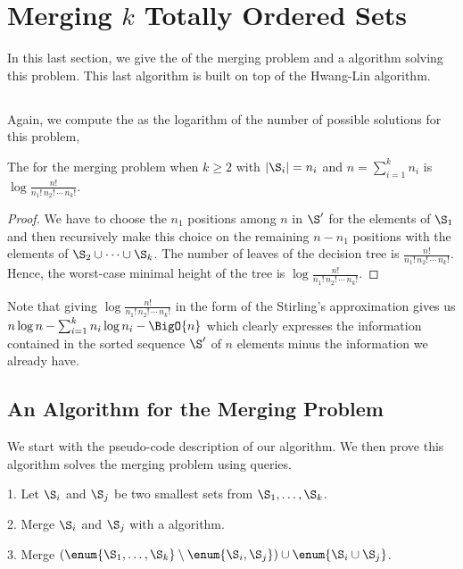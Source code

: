 \section{Merging $k$ Totally Ordered Sets}
\label{tree:merging:kgeq3}

In this last section, we give the \ITLB of the merging
problem and a \BigO{\ITLB} algorithm solving this problem. This last
algorithm is built on top of the Hwang-Lin algorithm.

\subsection{\ITLB}
\label{tree:merging:kgeq3:ITLB}

Again, we compute the \ITLB as the logarithm of the number of possible solutions
for this problem, \ie
\begin{theorem}
The \concept{\ITLB} for the merging problem when $k \ge 2$ with $|\S_i| = n_i$ and $n =
\sum_{i=1}^{k} n_i$ is \(\log \frac{n!}{n_1! \, n_2! \, \cdots \, n_k!}\).
\end{theorem}
\begin{proof}
We have to choose the $n_1$ positions among $n$ in $\S'$ for the elements of
$\S_1$ and then recursively make this choice on the remaining $n - n_1$
positions with the elements of \(\S_2 \cup \dots \cup \S_k\). The number of
leaves of the decision tree is $\frac{n!}{n_1! \, n_2! \, \cdots \, n_k!}$. Hence, the
worst-case minimal height of the tree is $\log \frac{n!}{n_1! \, n_2! \, \cdots
\, n_k!}$.
\end{proof}

Note that giving $\log \frac{n!}{n_1! \, n_2! \, \cdots \, n_k!}$ in the form of the
Stirling's approximation gives us \(n \log n - \sum_{i=1}^{k} n_i \log n_i -
\BigO{n}\)
which clearly expresses the information contained in the sorted sequence $\S'$ of
$n$ elements minus the information we already have.

\subsection{An Algorithm for the Merging Problem}
\label{tree:merging:kgeq3:alg}

We start with the pseudo-code description of our algorithm. We then prove this
algorithm solves the merging problem using \BigO{\ITLB} queries.
\begin{algorithm}
\item[1.] Let \(\S_i\) and \(\S_j\) be two smallest sets from \(\S_1 ,
\dots , \S_k\).
\item[2.] Merge \(\S_i\) and \(\S_j\) with a \BigO{\ITLB} algorithm.
\item[3.] Merge \((\enum{\S_1 , \dots , \S_k} \setminus \enum{\S_i,\S_j} )
\cup \enum{\S_i \cup \S_j}\).
\end{algorithm}

